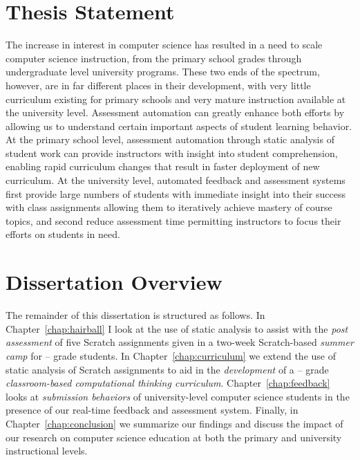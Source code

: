 \section{Thesis Statement}
The increase in interest in computer science has resulted in a need to scale
computer science instruction, from the primary school grades through
undergraduate level university programs. These two ends of the spectrum,
however, are in far different places in their development, with very little
curriculum existing for primary schools and very mature instruction available
at the university level. Assessment automation can greatly enhance both efforts
by allowing us to understand certain important aspects of student learning
behavior. At the primary school level, assessment automation through static
analysis of student work can provide instructors with insight into student
comprehension, enabling rapid curriculum changes that result in faster
deployment of new curriculum. At the university level, automated feedback and
assessment systems first provide large numbers of students with immediate
insight into their success with class assignments allowing them to iteratively
achieve mastery of course topics, and second reduce assessment time permitting
instructors to focus their efforts on students in need.

\section{Dissertation Overview}
The remainder of this dissertation is structured as follows. In
Chapter~\ref{chap:hairball} I look at the use of static analysis to assist with
the \emph{post assessment} of five Scratch assignments given in a two-week
Scratch-based \emph{summer camp} for -- grade students. In
Chapter~\ref{chap:curriculum} we extend the use of static analysis of Scratch
assignments to aid in the \emph{development} of a -- grade
\emph{classroom-based computational thinking
  curriculum}. Chapter~\ref{chap:feedback} looks at \emph{submission behaviors}
of university-level computer science students in the presence of our real-time
feedback and assessment system. Finally, in Chapter~\ref{chap:conclusion} we
summarize our findings and discuss the impact of our research on computer
science education at both the primary and university instructional levels.
